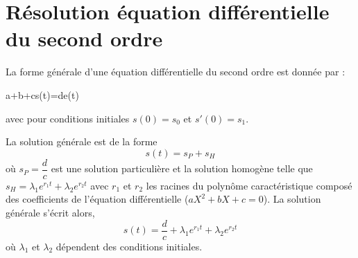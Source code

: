 \section[Second ordre]{Résolution équation différentielle du second ordre}
La forme générale d'une équation différentielle du second ordre est
donnée par : 
\begin{bequation}
    a+b+cs(t)=d\cdot e(t)
\end{bequation}
avec pour conditions initiales $s(0)=s_0$ et $s'(0)=s_1$.

La solution générale est de la forme 
\[
    s(t)=s_P+s_H
\]
où $s_P=\dfrac{d}{c}$ est une solution particulière et la solution homogène 
telle que $s_H=\lambda_1 e^{r_1 t}+
\lambda_2 e^{r_2 t}$ avec $r_1$ et $r_2$ les racines du polynôme 
caractéristique composé des coefficients de l'équation différentielle 
($aX^2+bX+c=0$).
La solution générale s'écrit alors,
\[
    s(t)=\dfrac{d}{c}+\lambda_1 e^{r_1 t}+\lambda_2 e^{r_2 t}
\]
où $\lambda_1$ et $\lambda_2$ dépendent des conditions initiales. 

